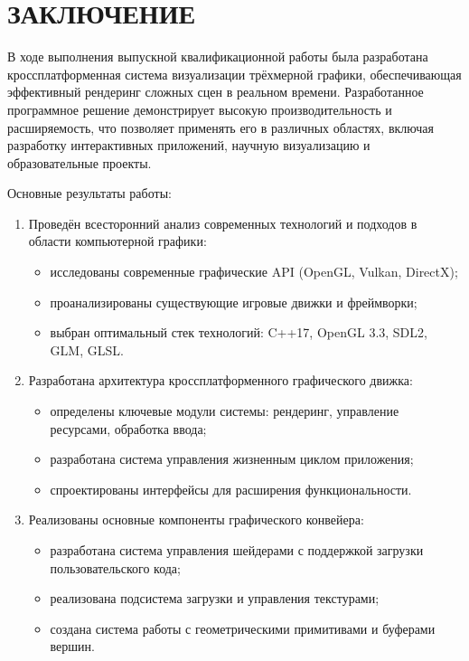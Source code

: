 \section*{ЗАКЛЮЧЕНИЕ}

В ходе выполнения выпускной квалификационной работы была разработана кроссплатформенная система визуализации трёхмерной графики, обеспечивающая эффективный рендеринг сложных сцен в реальном времени. Разработанное программное решение демонстрирует высокую производительность и расширяемость, что позволяет применять его в различных областях, включая разработку интерактивных приложений, научную визуализацию и образовательные проекты.

Основные результаты работы:

\begin{enumerate}
    \item Проведён всесторонний анализ современных технологий и подходов в области компьютерной графики:
    \begin{itemize}
        \item исследованы современные графические API (OpenGL, Vulkan, DirectX);
        \item проанализированы существующие игровые движки и фреймворки;
        \item выбран оптимальный стек технологий: C++17, OpenGL 3.3, SDL2, GLM, GLSL.
    \end{itemize}
    
    \item Разработана архитектура кроссплатформенного графического движка:
    \begin{itemize}
        \item определены ключевые модули системы: рендеринг, управление ресурсами, обработка ввода;
        \item разработана система управления жизненным циклом приложения;
        \item спроектированы интерфейсы для расширения функциональности.
    \end{itemize}
    
    \item Реализованы основные компоненты графического конвейера:
    \begin{itemize}
        \item разработана система управления шейдерами с поддержкой загрузки пользовательского кода;
        \item реализована подсистема загрузки и управления текстурами;
        \item создана система работы с геометрическими примитивами и буферами вершин.
    \end{itemize}
    

\end{enumerate}
